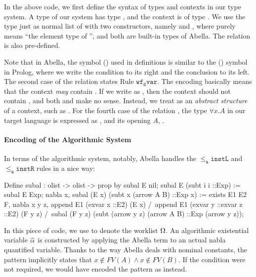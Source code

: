 In the above code, we first define the syntax of types and contexts in our type system.
A type of our system has type , and the context is of type .
We use the type  just as normal list of  with two constructors,
namely  and ,
where  purely means ``the element type of '',
and both are built-in types of Abella.
The  relation is also pre-defined.

Note that in Abella, the symbol (\abellae{:=}) used in definitions
is similar to the (\abellae{:-}) symbol in Prolog,
where we write the condition to its right and the conclusion to its left.
The second case of the relation  states Rule $\mathtt{wf_d var}$.
The encoding  basically means that the context \emph{may} contain .
If we write  as , then the context should not contain , and both  and  make no sense.
Instead, we treat  as an \emph{abstract structure} of a context, such as .
For the fourth case of the relation , the type $\forall x. A$ in our target language is expressed as , and its opening $A$, .

\paragraph{Encoding of the Algorithmic System}
In terms of the algorithmic system, notably, Abella handles the
$\mathtt{{\le_a}instL}$ and $\mathtt{{\le_a}instR}$ rules in a nice way:
\begin{abella}
	Define subal : olist -> olist -> prop by
		subal E nil;
		subal E (subt i i ::Exp) := subal E Exp;
		nabla x, subal (E x) (subt x (arrow A B) ::Exp x) :=
			exists E1 E2 F, nabla x y z, append E1 (exvar x ::E2) (E x) /\
				append E1 (exvar y ::exvar z ::E2) (F y z) /\
				subal (F y z) (subt (arrow y z) (arrow A B) ::Exp (arrow y z));
\end{abella}
In this piece of code, we use  to denote the worklist $\Omega$.
An algorithmic existential variable $\al$ is constructed by applying 
the Abella term \abellae{exvar} to an actual nabla quantified variable.
Thanks to the way Abella deals with nominal constants, the pattern 
\abellae{subt x (arrow A B)} implicitly states that $x\notin FV(A) \land x\notin FV(B)$.
If the condition were not required, we would have encoded the pattern as 
\abellae{subt x (arrow (A x) (B x))} instead.

